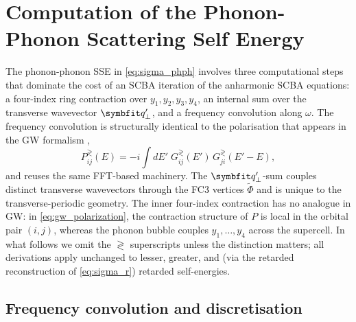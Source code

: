 \section{Computation of the Phonon-Phonon Scattering Self Energy}
\label{sec:phph_computation}

The phonon-phonon SSE in \cref{eq:sigma_phph} involves three computational
steps that dominate the cost of an SCBA iteration of the anharmonic
SCBA equations: a four-index ring
contraction over $y_1,y_2,y_3,y_4$, an internal sum over the
transverse wavevector $\qp'$, and a frequency convolution along
$\omega$. The frequency convolution is structurally identical to the
polarisation that appears in the GW formalism
\cite{deuschle_electron-electron_2025},
\begin{equation}\label{eq:gw_polarization}
  P_{ij}^{\gtrless}(E)
  = -i \int dE'\;
       G_{ij}^{\gtrless}(E')\,G_{ji}^{\gtrless}(E'-E),
\end{equation}
and reuses the same FFT-based machinery. The $\qp'$-sum couples
distinct transverse wavevectors through the FC3 vertices
$\tilde\Phi$ and is unique to the transverse-periodic geometry. The
inner four-index contraction has no analogue in GW: in
\cref{eq:gw_polarization}, the contraction structure of $P$ is local
in the orbital pair $(i,j)$, whereas the phonon bubble couples
$y_1,\dots,y_4$ across the supercell. In what follows we omit the
$\gtrless$ superscripts unless the distinction matters; all
derivations apply unchanged to lesser, greater, and (via the
retarded reconstruction of \cref{eq:sigma_r}) retarded
self-energies.

\subsection{Frequency convolution and discretisation}
\label{ssec:phph_freq}

